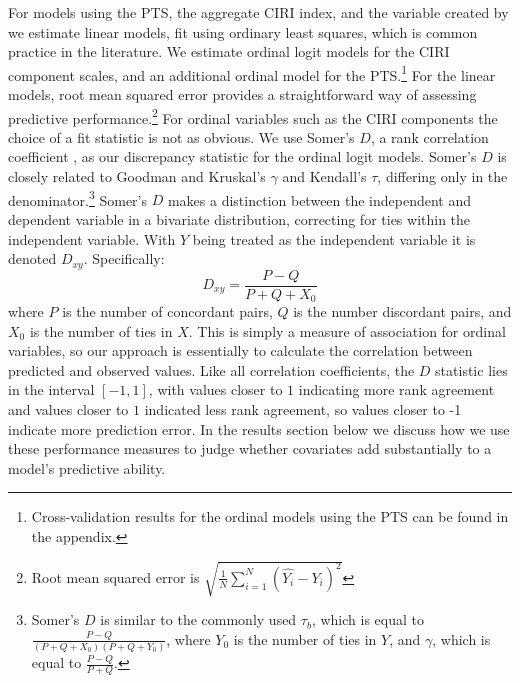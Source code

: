 \documentclass[11pt]{article}
\begin{document}
For models using the PTS, the aggregate CIRI index, and the variable created by \citet{Fariss2013} we estimate linear models, fit using ordinary least squares, which is common practice in the literature. We estimate ordinal logit models for the CIRI component scales, and an additional ordinal model for the PTS.\footnote{Cross-validation results for the ordinal models using the PTS can be found in the appendix.} For the linear models, root mean squared error provides a straightforward way of assessing predictive performance.\footnote{Root mean squared error is $\displaystyle \sqrt{\frac{1}{N} \sum\limits_{i=1}^N (\hat{Y_{i}} - Y_{i})^2} $} For ordinal variables such as the CIRI components the choice of a fit statistic is not as obvious. We use Somer's $D$, a rank correlation coefficient  \citep{Somers1962}, as our discrepancy statistic for the ordinal logit models.
Somer's $D$ is closely related to Goodman and Kruskal's $\gamma$ and Kendall's $\tau$, differing only in the denominator.\footnote{Somer's $D$ is similar to the commonly used $\tau_b$, which is equal to $\frac{P - Q}{(P+Q+X_0)(P+Q+Y_0)}$, where $Y_0$ is the number of ties in $Y$, and $\gamma$, which is equal to $\frac{P - Q}{P + Q}$.} Somer's $D$ makes a distinction between the independent and dependent variable in a bivariate distribution, correcting for ties within the independent variable. With $Y$ being treated as the independent variable it is denoted $D_{xy}$. 
Specifically:
$$D_{xy} = \frac{P - Q}{P + Q + X_0}$$
\noindent where $P$ is the number of concordant pairs, $Q$ is the number discordant pairs, and $X_0$ is the number of ties in $X$. This is simply a measure of association for ordinal variables, so our approach is essentially to calculate the correlation between predicted and observed values. Like all correlation coefficients, the $D$ statistic lies in the interval $[-1, 1]$, with values closer to $1$ indicating more rank agreement and values closer to $1$ indicated less rank agreement, so values closer to -1 indicate more prediction error. In the results section below we discuss how we use these performance measures to judge whether covariates add substantially to a model's predictive ability.
\end{document}
